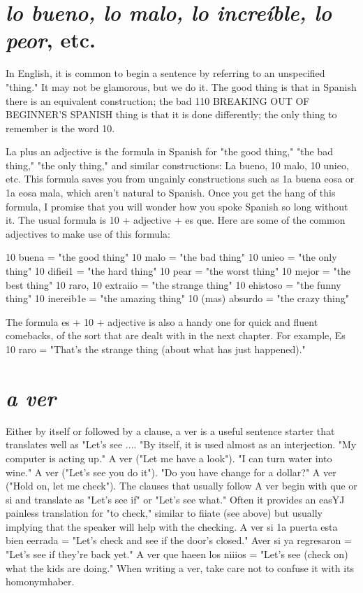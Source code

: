 \documentclass[14pt,a4paper,oneside]{memoir}
\newcommand{\bsk}{\vspace{20pt}}
\begin{document}
\section{\emph{lo bueno, lo malo, lo increíble, lo peor}, etc.}

In English, it is common to begin a sentence by referring to an
unspecified "thing." It may not be glamorous, but we do it. The good
thing is that in Spanish there is an equivalent construction; the bad
110 BREAKING OUT OF BEGINNER'S SPANISH
thing is that it is done differently; the only thing to remember is the
word 10.

La plus an adjective is the formula in Spanish for "the good
thing," "the bad thing," "the only thing," and similar constructions:
La bueno, 10 malo, 10 unieo, etc. This formula saves you from ungainly constructions such as 1a buena eosa or 1a eosa mala, which
aren't natural to Spanish. Once you get the hang of this formula, I
promise that you will wonder how you spoke Spanish so long without
it. The usual formula is 10 + adjective + es que. Here are some of the
common adjectives to make use of this formula:

\bsk

10 buena = "the good thing"
10 malo = "the bad thing"
10 unieo = "the only thing"
10 difiei1 = "the hard thing"
10 pear = "the worst thing"
10 mejor = "the best thing"
10 raro, 10 extraiio = "the strange thing"
10 ehistoso = "the funny thing"
10 inereib1e = "the amazing thing"
10 (mas) absurdo = "the crazy thing"

\bsk

The formula es + 10 + adjective is also a handy one for quick and
fluent comebacks, of the sort that are dealt with in the next chapter.
For example, Es 10 raro = "That's the strange thing (about what has
just happened)."

\section{\emph{a ver}}

Either by itself or followed by a clause, a ver is a useful sentence starter that translates well as "Let's see .... "By itself, it is used
almost as an interjection. "My computer is acting up." A ver ("Let
me have a look"). "I can turn water into wine." A ver ("Let's see you
do it"). "Do you have change for a dollar?" A ver ("Hold on, let me
check"). The clauses that usually follow A ver begin with que or si
and translate as "Let's see if" or "Let's see what." Often it provides an
easYJ painless translation for "to check," similar to fiiate (see above)
but usually implying that the speaker will help with the checking. A
ver si 1a puerta esta bien eerrada = "Let's check and see if the door's
closed." Aver si ya regresaron = "Let's see if they're back yet." A
ver que haeen los niiios = "Let's see (check on) what the kids are doing." When writing a ver, take care not to confuse it with its homonymhaber.
\end{document}
